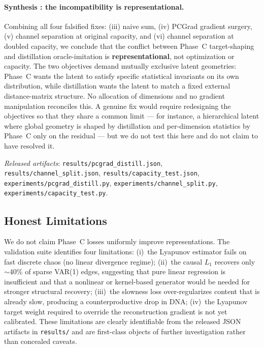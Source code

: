 \documentclass[11pt,a4paper]{article}
\begin{document}
\paragraph{Synthesis : the incompatibility is representational.}
Combining all four falsified fixes:
(iii) naive sum,
(iv) PCGrad gradient surgery,
(v) channel separation at original capacity, and
(vi) channel separation at doubled capacity,
we conclude that the conflict between Phase~C target-shaping and
distillation oracle-imitation is \textbf{representational}, not
optimization or capacity. The two objectives demand mutually exclusive
latent geometries: Phase~C wants the latent to satisfy specific
statistical invariants on its own distribution, while distillation
wants the latent to match a fixed external distance-matrix structure.
No allocation of dimensions and no gradient manipulation reconciles
this. A genuine fix would require redesigning the objectives so that
they share a common limit --- for instance, a hierarchical latent
where global geometry is shaped by distillation and per-dimension
statistics by Phase~C only on the residual --- but we do not test
this here and do not claim to have resolved it.

\emph{Released artifacts}:
\verb|results/pcgrad_distill.json|,
\verb|results/channel_split.json|,
\verb|results/capacity_test.json|,
\verb|experiments/pcgrad_distill.py|,
\verb|experiments/channel_split.py|,
\verb|experiments/capacity_test.py|.

\subsection{Honest Limitations}

We do not claim Phase~C losses uniformly improve representations.
The validation suite identifies four limitations:
(i)~the Lyapunov estimator fails on fast discrete chaos
(no linear divergence regime);
(ii)~the causal $L_1$ recovers only $\sim$40\% of sparse VAR(1)
edges, suggesting that pure linear regression is insufficient and
that a nonlinear or kernel-based generator would be needed for
stronger structural recovery;
(iii)~the slowness loss over-regularizes content that is already
slow, producing a counterproductive drop in DNA;
(iv)~the Lyapunov target weight required to override the
reconstruction gradient is not yet calibrated.
These limitations are clearly identifiable from the released JSON
artifacts in \verb|results/| and are first-class objects of further
investigation rather than concealed caveats.
\end{document}
